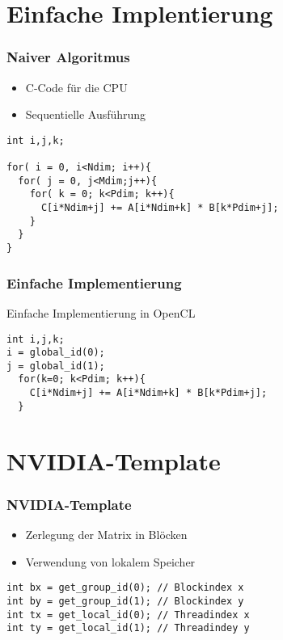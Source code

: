 \documentclass{beamer}
\begin{document}
\section{Einfache Implentierung}



\begin{frame}[fragile]
\frametitle{Naiver Algoritmus}

\begin{itemize}
\item C-Code f\"ur die CPU 
\item Sequentielle Ausf\"uhrung
\end{itemize}

\begin{lstlisting}[style=customc,caption=Matrixmultiplication in C]
int i,j,k;

for( i = 0, i<Ndim; i++){
  for( j = 0, j<Mdim;j++){
    for( k = 0; k<Pdim; k++){
      C[i*Ndim+j] += A[i*Ndim+k] * B[k*Pdim+j]; 
    }
  }
}
\end{lstlisting}



\end{frame}



\begin{frame}[fragile]
\frametitle{Einfache Implementierung}
 
Einfache Implementierung in OpenCL
\begin{lstlisting}[style=customc,caption=Einfachster Code in OpenCL]
int i,j,k;
i = global_id(0);
j = global_id(1);
  for(k=0; k<Pdim; k++){
    C[i*Ndim+j] += A[i*Ndim+k] * B[k*Pdim+j]; 
  }
\end{lstlisting}



\end{frame}


\section{NVIDIA-Template}
\begin{frame}[fragile]
\frametitle{NVIDIA-Template}

\begin{itemize}
\item
Zerlegung der Matrix in Bl\"ocken
\item
Verwendung von lokalem Speicher 
\end{itemize}

\begin{lstlisting}[style=customc,caption=NVIDIA-Snippet]
int bx = get_group_id(0); // Blockindex x
int by = get_group_id(1); // Blockindex y
int tx = get_local_id(0); // Threadindex x
int ty = get_local_id(1); // Threadindey y
\end{lstlisting}



\end{frame}
\end{document}
